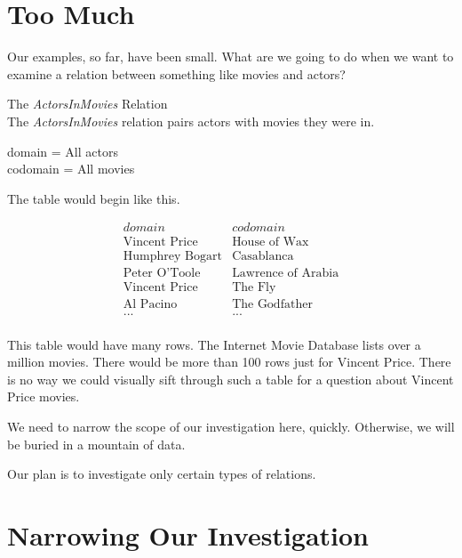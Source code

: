 \documentclass{ximera}
\begin{document}
\section{Too Much}

Our examples, so far, have been small.  What are we going to do when we want to examine a relation between something like movies and actors?  


\begin{example} The \textit{ActorsInMovies} Relation\\
The \textit{ActorsInMovies} relation pairs actors with movies they were in.

domain = All actors \\
codomain = All movies

The table would begin like this.

\[
\begin{array}{l|l}
    domain      & codomain      \\ \hline
    \text{Vincent Price}   &  \text{House of Wax} \\
    \text{Humphrey Bogart}   & \text{Casablanca} \\
    \text{Peter O'Toole}  &  \text{Lawrence of Arabia} \\
    \text{Vincent Price}  &  \text{The Fly} \\
    \text{Al Pacino} &  \text{The Godfather} \\ 
    \text{...} &  \text{...} \\ 
\end{array}
\]

\end{example} 


This table would have many rows. The Internet Movie Database lists over a million movies.  There would be more than 100 rows just for Vincent Price. There is no way we could visually sift through such a table for a question about Vincent Price movies.

We need to narrow the scope of our investigation here, quickly. Otherwise, we will be buried in a mountain of data.

Our plan is to investigate only certain types of relations.








\section{Narrowing Our Investigation}
\end{document}

